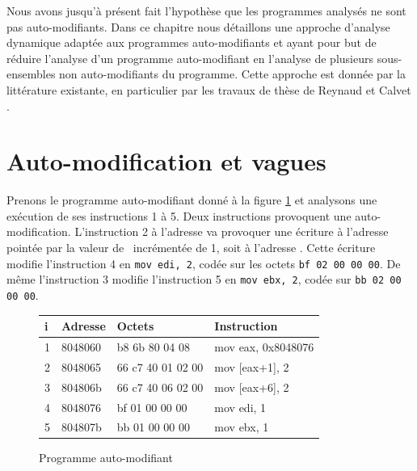 Nous avons jusqu'à présent fait l'hypothèse que les programmes analysés ne sont pas auto-modifiants.
Dans ce chapitre nous détaillons une approche d'analyse dynamique adaptée aux programmes auto-modifiants et ayant pour but de réduire l'analyse d'un programme auto-modifiant en l'analyse de plusieurs sous-ensembles non auto-modifiants du programme.
Cette approche est donnée par la littérature existante, en particulier par les travaux de thèse de Reynaud \cite{Reynaud2010} et Calvet \cite{Calvet2013}.

\section{Auto-modification et vagues}
Prenons le programme auto-modifiant donné à la figure \ref{fig:prg_asm_sm} et analysons une exécution de ses instructions 1 à 5.
Deux instructions provoquent une auto-modification.
L'instruction 2 à l'adresse  va provoquer une écriture à l'adresse pointée par la valeur de \eax\ incrémentée de 1, soit à l'adresse . Cette écriture modifie l'instruction 4 en \texttt{mov edi, 2}, codée sur les octets \texttt{bf 02 00 00 00}. De même l'instruction 3 modifie l'instruction 5 en \texttt{mov ebx, 2}, codée sur \texttt{bb 02 00 00 00}.
 
\begin{figure}
\begin{center}
\begin{tabular}[b]{|l|l|l|l|}
\hline
i & Adresse & Octets & Instruction\\ 
\hline
1 & 8048060  &  b8 6b 80 04 08         &  mov    eax, 0x8048076\\
2 & 8048065  &  66 c7 40 01 02 00      &  mov    [eax+1], 2 \\
3 & 804806b  &  66 c7 40 06 02 00      &  mov    [eax+6], 2 \\
4 & 8048076  &  bf 01 00 00 00         &  mov    edi, 1 \\
5 & 804807b  &  bb 01 00 00 00         &  mov    ebx, 1 \\
\hline
\end{tabular}
\end{center}
\caption{Programme auto-modifiant}
\label{fig:prg_asm_sm}
\end{figure}


